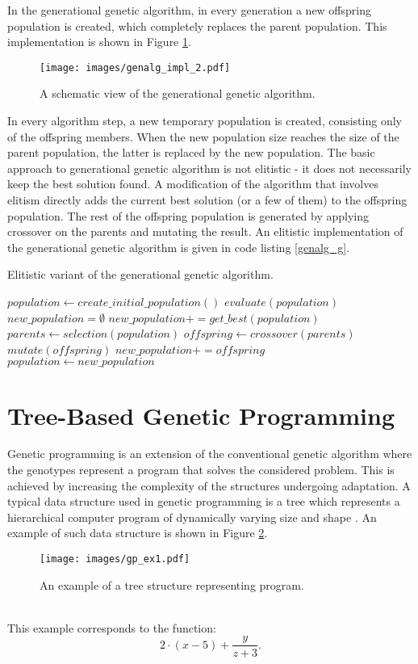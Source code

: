 In the generational genetic algorithm, in every generation a new offspring population is created, which completely replaces the parent population.
This implementation is shown in Figure \ref{genalg:impl_2}.
\begin{figure}[ht]
    \centering
    \texttt{[image: images/genalg\_impl\_2.pdf]}
    \caption{A schematic view of the generational genetic algorithm.}
    \label{genalg:impl_2}
\end{figure}
In every algorithm step, a new temporary population is created, consisting only of the offspring members.
When the new population size reaches the size of the parent population, the latter is replaced by the new population.
The basic approach to generational genetic algorithm is not elitistic - it does not necessarily keep the best solution found. 
A modification of the algorithm that involves elitism directly adds the current best solution (or a few of them) to the offspring population.
The rest of the offspring population is generated by applying crossover on the parents and mutating the result.
An elitistic implementation of the generational genetic algorithm is given in code listing \ref{genalg_g}.
\begin{algorithm}
\caption{Elitistic variant of the generational genetic algorithm.\label{genalg_g}}
\begin{algorithmic}
\STATE $population \leftarrow create\_initial\_population()$
\STATE $evaluate(population)$
\STATE $new\_population = \emptyset$
\STATE $new\_population += get\_best(population)$
\STATE $parents \leftarrow selection(population)$
\STATE $offspring \leftarrow crossover(parents)$
\STATE $mutate(offspring)$
\STATE $new\_population += offspring$
\ENDWHILE
\STATE $population \leftarrow new\_population$
\ENDWHILE
\end{algorithmic}
\end{algorithm}

\section{Tree-Based Genetic Programming}
Genetic programming is an extension of the conventional genetic algorithm where the genotypes represent a program that solves the considered problem.
This is achieved by increasing the complexity of the structures undergoing adaptation.
A typical data structure used in genetic programming is a tree which represents a hierarchical computer program of dynamically varying size and shape \cite{koza1992genetic}.
An example of such data structure is shown in Figure \ref{genprog:ex1}.
\begin{figure}[ht]
    \centering
    \texttt{[image: images/gp\_ex1.pdf]}
    \caption{An example of a tree structure representing program.}
    \label{genprog:ex1}
\end{figure}
\\This example corresponds to the function:
\begin{equation*}
2 \cdot (x-5) + \frac{y}{z + 3}.
\end{equation*}

